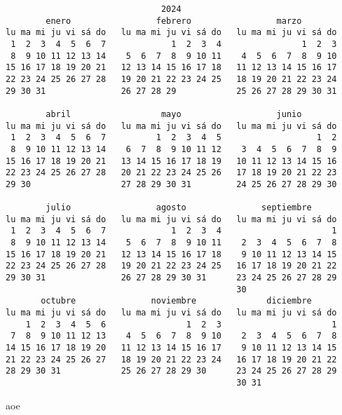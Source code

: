 \documentclass[letterpaper,10pt]{article}
\begin{document}
\begin{multicols}{3}
\begin{center}
\begin{tiny}
\begin{verbatim}                               2024
        enero                 febrero                 marzo
lu ma mi ju vi sá do   lu ma mi ju vi sá do   lu ma mi ju vi sá do
 1  2  3  4  5  6  7             1  2  3  4                1  2  3
 8  9 10 11 12 13 14    5  6  7  8  9 10 11    4  5  6  7  8  9 10
15 16 17 18 19 20 21   12 13 14 15 16 17 18   11 12 13 14 15 16 17
22 23 24 25 26 27 28   19 20 21 22 23 24 25   18 19 20 21 22 23 24
29 30 31               26 27 28 29            25 26 27 28 29 30 31

        abril                  mayo                   junio
lu ma mi ju vi sá do   lu ma mi ju vi sá do   lu ma mi ju vi sá do
 1  2  3  4  5  6  7          1  2  3  4  5                   1  2
 8  9 10 11 12 13 14    6  7  8  9 10 11 12    3  4  5  6  7  8  9
15 16 17 18 19 20 21   13 14 15 16 17 18 19   10 11 12 13 14 15 16
22 23 24 25 26 27 28   20 21 22 23 24 25 26   17 18 19 20 21 22 23
29 30                  27 28 29 30 31         24 25 26 27 28 29 30

        julio                 agosto               septiembre
lu ma mi ju vi sá do   lu ma mi ju vi sá do   lu ma mi ju vi sá do
 1  2  3  4  5  6  7             1  2  3  4                      1
 8  9 10 11 12 13 14    5  6  7  8  9 10 11    2  3  4  5  6  7  8
15 16 17 18 19 20 21   12 13 14 15 16 17 18    9 10 11 12 13 14 15
22 23 24 25 26 27 28   19 20 21 22 23 24 25   16 17 18 19 20 21 22
29 30 31               26 27 28 29 30 31      23 24 25 26 27 28 29
                                              30
       octubre               noviembre              diciembre
lu ma mi ju vi sá do   lu ma mi ju vi sá do   lu ma mi ju vi sá do
    1  2  3  4  5  6                1  2  3                      1
 7  8  9 10 11 12 13    4  5  6  7  8  9 10    2  3  4  5  6  7  8
14 15 16 17 18 19 20   11 12 13 14 15 16 17    9 10 11 12 13 14 15
21 22 23 24 25 26 27   18 19 20 21 22 23 24   16 17 18 19 20 21 22
28 29 30 31            25 26 27 28 29 30      23 24 25 26 27 28 29
                                              30 31\end{verbatim}
\end{tiny}
\end{center}
\breakcolumn
aoe
\breakcolumn
\end{multicols}
\end{document}
